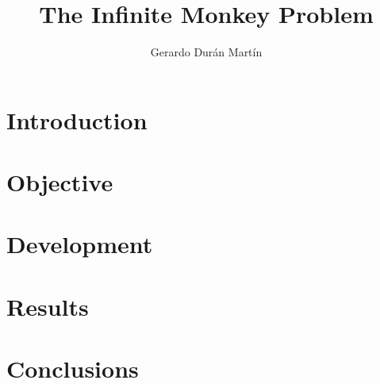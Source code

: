 \documentclass{report}
\title{The Infinite Monkey Problem}
\author{Gerardo Durán Martín}
\begin{document}
\maketitle
\tableofcontents{}

\newpage

\section{Introduction}

\section{Objective}
\section{Development}
\section{Results}
\section{Conclusions}
\end{document}
